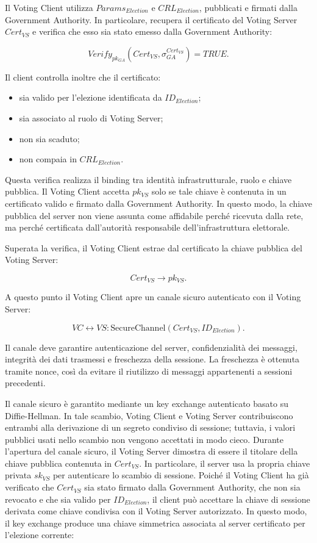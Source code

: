 \documentclass[a4paper,12pt]{article}
\begin{document}
Il Voting Client utilizza \(Params_{Election}\) e \(CRL_{Election}\), pubblicati e firmati dalla Government Authority.
In particolare, recupera il certificato del Voting Server \(Cert_{VS}\) e verifica che esso sia stato emesso dalla Government Authority:

\[
	Verify_{pk_{GA}}(Cert_{VS}, \sigma_{GA}^{Cert_{VS}}) = TRUE.
\]

Il client controlla inoltre che il certificato:

\begin{itemize}
	\item sia valido per l'elezione identificata da \(ID_{Election}\);
	\item sia associato al ruolo di Voting Server;
	\item non sia scaduto;
	\item non compaia in \(CRL_{Election}\).
\end{itemize}

Questa verifica realizza il binding tra identit\`a infrastrutturale, ruolo e chiave pubblica.
Il Voting Client accetta \(pk_{VS}\) solo se tale chiave \`e contenuta in un certificato valido e firmato dalla Government Authority.
In questo modo, la chiave pubblica del server non viene assunta come affidabile perch\'e ricevuta dalla rete, ma perch\'e certificata dall'autorit\`a responsabile dell'infrastruttura elettorale.

Superata la verifica, il Voting Client estrae dal certificato la chiave pubblica del Voting Server:

\[
	Cert_{VS} \longrightarrow pk_{VS}.
\]

A questo punto il Voting Client apre un canale sicuro autenticato con il Voting Server:

\[
	VC \leftrightarrow VS :
	\text{SecureChannel}(Cert_{VS}, ID_{Election}).
\]

Il canale deve garantire autenticazione del server, confidenzialit\`a dei messaggi, integrit\`a dei dati trasmessi e freschezza della sessione.
La freschezza è ottenuta tramite nonce, cos\`i da evitare il riutilizzo di messaggi appartenenti a sessioni precedenti.

Il canale sicuro è garantito mediante un key exchange autenticato basato su Diffie-Hellman.
In tale scambio, Voting Client e Voting Server contribuiscono entrambi alla derivazione di un segreto condiviso di sessione; tuttavia, i valori pubblici usati nello scambio non vengono accettati in modo cieco.
Durante l'apertura del canale sicuro, il Voting Server dimostra di essere il titolare della chiave pubblica contenuta in \(Cert_{VS}\).
In particolare, il server usa la propria chiave privata \(sk_{VS}\) per autenticare lo scambio di sessione.
Poich\'e il Voting Client ha gi\`a verificato che \(Cert_{VS}\) sia stato firmato dalla Government Authority, che non sia revocato e che sia valido per \(ID_{Election}\), il client pu\`o accettare la chiave di sessione derivata come chiave condivisa con il Voting Server autorizzato.
In questo modo, il key exchange  produce una chiave simmetrica associata al server certificato per l'elezione corrente:
\end{document}
